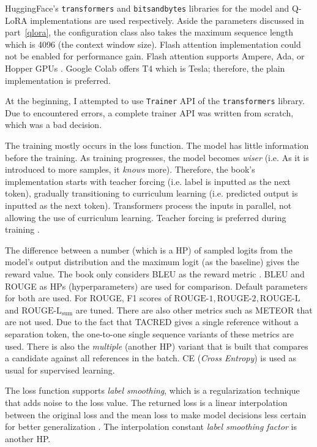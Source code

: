 \documentclass{article}
\begin{document}
HuggingFace's \texttt{transformers} and \texttt{bitsandbytes} libraries for the model and Q-LoRA implementations are used respectively. Aside the parameters discussed in part~\ref{qlora}, the configuration class also takes the maximum sequence length which is 4096 (the context window size). Flash attention implementation could not be enabled for performance gain. Flash attention supports Ampere, Ada, or Hopper GPUs \cite{dao-ailab_github_2022}. Google Colab offers T4 which is Tesla; therefore, the plain implementation is preferred.

At the beginning, I attempted to use \texttt{Trainer} API of the \texttt{transformers} library. Due to encountered errors, a complete trainer API was written from scratch, which was a bad decision.

The training mostly occurs in the loss function. The model has little information before the training. As training progresses, the model becomes \textit{wiser} (i.e. As it is introduced to more samples, it \textit{knows} more). Therefore, the book's implementation starts with teacher forcing (i.e. label is inputted as the next token), gradually transitioning to curriculum learning (i.e. predicted output is inputted as the next token). Transformers process the inputs in parallel, not allowing the use of curriculum learning. Teacher forcing is preferred during training \cite{lapan_deep_2020}.

The difference between a number (which is a HP) of sampled logits from the model's output distribution and the maximum logit (as the baseline) gives the reward value. The book only considers BLEU as the reward metric \cite{lapan_deep_2020}. BLEU and ROUGE as HPs (hyperparameters) are used for comparison. Default parameters for both are used. For ROUGE, F1 scores of $\text{ROUGE-1}, \text{ROUGE-2}, \text{ROUGE-L}$ and $\text{ROUGE-L}_{\text{sum}}$ are tuned. There are also other metrics such as METEOR that are not used. Due to the fact that TACRED gives a single reference without a separation token, the one-to-one single sequence variants of these metrics are used. There is also the \textit{multiple} (another HP) variant that is built that compares a candidate against all references in the batch. CE (\textit{Cross Entropy}) is used as usual for supervised learning.

The loss function supports \textit{label smoothing}, which is a regularization technique that adds noise to the loss value. The returned loss is a linear interpolation between the original loss and the mean loss to make model decisions less certain for better generalization \cite{muller_when_2020}. The interpolation constant \textit{label smoothing factor} is another HP.
\end{document}
